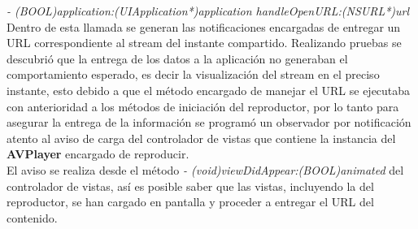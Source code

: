 \textit{- (BOOL)application:(UIApplication*)application handleOpenURL:(NSURL*)url}\\

Dentro de esta llamada se generan las notificaciones encargadas de entregar un URL correspondiente al stream del instante compartido. Realizando pruebas se descubrió que la entrega de los datos a la aplicación no generaban el comportamiento esperado, es decir la visualización del stream en el preciso instante, esto debido a que el método encargado de manejar el URL se ejecutaba con anterioridad a los métodos de iniciación del reproductor, por lo tanto para asegurar la entrega de la información se programó un observador por notificación \cite{bib:ios-nsnotificationcenter} atento al aviso de carga del controlador de vistas que contiene la instancia del \textbf{AVPlayer} encargado de reproducir. \\

El aviso se realiza desde el método \textit{- (void)viewDidAppear:(BOOL)animated} del controlador de vistas, así es posible saber que las vistas, incluyendo la del reproductor, se han cargado en pantalla y proceder a entregar el URL del contenido.



